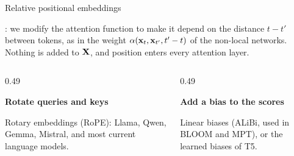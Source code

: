 
\begin{frame}{Relative positional embeddings}
    \setlength{\parskip}{6pt}

     : we
    modify the attention function to make it depend on the distance $t-t'$
    between tokens, as in the weight $\alpha(\boldsymbol{\mathbf{x}}_t,\boldsymbol{\mathbf{x}}_{t'},t'-t)$ of
    the non-local networks. Nothing is added to $\boldsymbol{\mathbf{X}}$, and position enters
    every attention layer.

    \begin{columns}[T,onlytextwidth]
        \begin{column}{0.49\textwidth}
            \begin{tcolorbox}[nndsblue,courseheight={tf-relative}{0.3\textheight}]
                \textbf{\color{darkcerulean}Rotate queries and keys}

                Rotary embeddings (RoPE): Llama, Qwen, Gemma, Mistral, and most
                current language models.
            \end{tcolorbox}
        \end{column}
        \begin{column}{0.49\textwidth}
            \begin{tcolorbox}[nndsgreen,courseheight={tf-relative}{0.3\textheight}]
                \textbf{\color{darkgreen}Add a bias to the scores}

                Linear biases (ALiBi, used in BLOOM and MPT), or the learned
                biases of T5.
            \end{tcolorbox}
        \end{column}
    \end{columns}

\end{frame}

